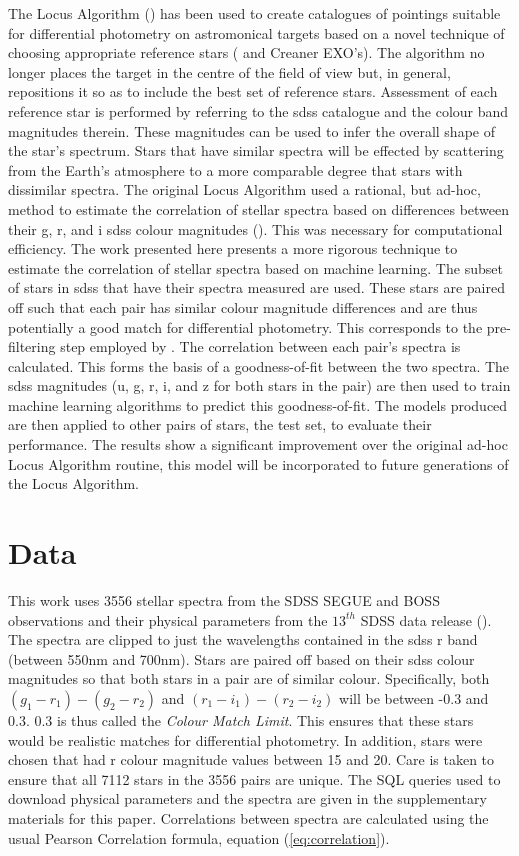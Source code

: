 \documentclass[preprint, 3p,
authoryear]{elsarticle} %
\begin{document}
The Locus Algorithm (\citet{creaner2022}) has been used to create
catalogues of pointings suitable for differential photometry on
astromonical targets based on a novel technique of choosing appropriate
reference stars (\citet{creaner2020} and Creaner EXO's). The algorithm
no longer places the target in the centre of the field of view but, in
general, repositions it so as to include the best set of reference
stars. Assessment of each reference star is performed by referring to
the sdss catalogue and the colour band magnitudes therein. These
magnitudes can be used to infer the overall shape of the star's
spectrum. Stars that have similar spectra will be effected by scattering
from the Earth's atmosphere to a more comparable degree that stars with
dissimilar spectra. The original Locus Algorithm used a rational, but
ad-hoc, method to estimate the correlation of stellar spectra based on
differences between their g, r, and i sdss colour magnitudes
(\citet{Creaner2017}). This was necessary for computational efficiency.
The work presented here presents a more rigorous technique to estimate
the correlation of stellar spectra based on machine learning. The subset
of stars in sdss that have their spectra measured are used. These stars
are paired off such that each pair has similar colour magnitude
differences and are thus potentially a good match for differential
photometry. This corresponds to the pre-filtering step employed by
\citet{Creaner2017}. The correlation between each pair's spectra is
calculated. This forms the basis of a goodness-of-fit between the two
spectra. The sdss magnitudes (u, g, r, i, and z for both stars in the
pair) are then used to train machine learning algorithms to predict this
goodness-of-fit. The models produced are then applied to other pairs of
stars, the test set, to evaluate their performance. The results show a
significant improvement over the original ad-hoc Locus Algorithm
routine, this model will be incorporated to future generations of the
Locus Algorithm.

\hypertarget{data}{%
\section{Data}\label{data}}

This work uses 3556 stellar spectra from the SDSS SEGUE and BOSS
observations and their physical parameters from the \(13^{th}\) SDSS
data release (\citet{Aguado2018}). The spectra are clipped to just the
wavelengths contained in the sdss r band (between 550nm and 700nm).
Stars are paired off based on their sdss colour magnitudes so that both
stars in a pair are of similar colour. Specifically, both
\((g_1-r_1)-(g_2-r_2)\) and \((r_1-i_1)-(r_2-i_2)\) will be between -0.3
and 0.3. 0.3 is thus called the \emph{Colour Match Limit}. This ensures
that these stars would be realistic matches for differential photometry.
In addition, stars were chosen that had r colour magnitude values
between 15 and 20. Care is taken to ensure that all 7112 stars in the
3556 pairs are unique. The SQL queries used to download physical
parameters and the spectra are given in the supplementary materials for
this paper. Correlations between spectra are calculated using the usual
Pearson Correlation formula, equation (\ref{eq:correlation}).
\end{document}
